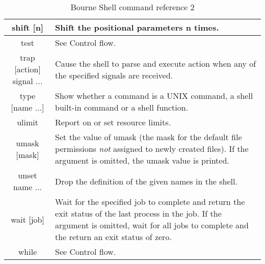 \begin{table*}[H]
	\begin{tabular}{|c|p{10cm}|}
		\hline
		 shift [n] &  Shift the positional parameters n times. \\ \hline
		 test &  See Control flow. \\ \hline
		 trap [action] signal ... &  Cause the shell to parse and execute action when any of the specified signals are received. \\ \hline
		 type [name ...] &  Show whether a command is a UNIX command, a shell built-in command or a shell function. \\ \hline
		 ulimit &  Report on or set resource limits. \\ \hline
		 umask [mask] &  Set the value of umask (the mask for the default file permissions \emph{not} assigned to newly created files). If the argument is omitted, the umask value is printed. \\ \hline
		 unset name ... &  Drop the definition of the given names in the shell. \\ \hline
		 wait [job] &  Wait for the specified job to complete and return the exit status of the last process in the job. If the argument is omitted, wait for all jobs to complete and the return an exit status of zero. \\ \hline
		 while &  See Control flow. \\ \hline
	\end{tabular}
	\caption{Bourne Shell command reference 2}
	\label{tab:refcmd2}
\end{table*}
